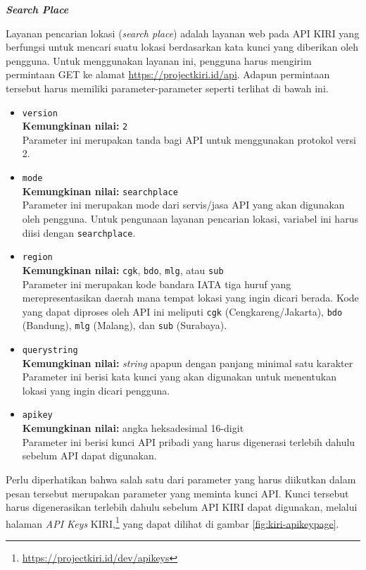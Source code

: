 \documentclass[a4paper,twoside]{article}
\begin{document}
\begin{enumerate}
\large{\textbf{\textit{Search Place}}}
\label{sec:kiri-api-searchplace}

Layanan pencarian lokasi (\textit{search place}) adalah layanan web pada API KIRI yang berfungsi untuk mencari suatu lokasi berdasarkan kata kunci yang diberikan oleh pengguna. Untuk menggunakan layanan ini, pengguna harus mengirim permintaan GET ke alamat \href{https://projectkiri.id/api}{https://projectkiri.id/api}. Adapun permintaan tersebut harus memiliki parameter-parameter seperti terlihat di bawah ini.

\begin{itemize}
	\item \verb|version|\\
	\textbf{Kemungkinan nilai:} \verb|2|\\
	Parameter ini merupakan tanda bagi API untuk menggunakan protokol versi 2.
	\item \verb|mode|\\
	\textbf{Kemungkinan nilai:} \verb|searchplace|\\
	Parameter ini merupakan mode dari servis/jasa API yang akan digunakan oleh pengguna. Untuk pengunaan layanan pencarian lokasi, variabel ini harus diisi dengan \verb|searchplace|.
	\item \verb|region|\\
	\textbf{Kemungkinan nilai:} \verb|cgk|, \verb|bdo|, \verb|mlg|, atau \verb|sub|\\
	Parameter ini merupakan kode bandara IATA tiga huruf yang merepresentasikan daerah mana tempat lokasi yang ingin dicari berada. Kode yang dapat diproses oleh API ini meliputi \verb|cgk| (Cengkareng/Jakarta), \verb|bdo| (Bandung), \verb|mlg| (Malang), dan \verb|sub| (Surabaya).
	\newpage %
	\item \verb|querystring|\\
	\textbf{Kemungkinan nilai:} \textit{string} apapun dengan panjang minimal satu karakter\\
	Parameter ini berisi kata kunci yang akan digunakan untuk menentukan lokasi yang ingin dicari pengguna.
	\item \verb|apikey|\\
	\textbf{Kemungkinan nilai:} angka heksadesimal 16-digit\\
	Parameter ini berisi kunci API pribadi yang harus digenerasi terlebih dahulu sebelum API dapat digunakan.
\end{itemize}
\vspace{\baselineskip}
Perlu diperhatikan bahwa salah satu dari parameter yang harus diikutkan dalam pesan tersebut merupakan parameter yang meminta kunci API. Kunci tersebut harus digenerasikan terlebih dahulu sebelum API KIRI dapat digunakan, melalui halaman \textit{API Keys} KIRI,\footnote{\href{https://projectkiri.id/dev/apikeys}{https://projectkiri.id/dev/apikeys}} yang dapat dilihat di gambar \ref{fig:kiri-apikeypage}.


\end{enumerate}
\end{document}
